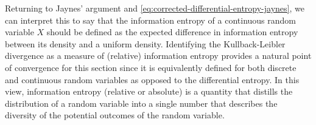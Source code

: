 Returning to Jaynes' argument and \cref{eq:corrected-differential-entropy-jaynes}, we can interpret this to say that the information entropy of a continuous random variable $X$ should be defined as the expected difference in information entropy between its density and a uniform density. 
Identifying the Kullback-Leibler divergence as a measure of (relative) information entropy provides a natural point of convergence for this section since it is equivalently defined for both discrete and continuous random variables as opposed to the differential entropy. 
In this view, information entropy (relative or absolute) is a quantity that distills the distribution of a random variable into a single number that describes the diversity of the potential outcomes of the random variable. 












